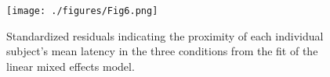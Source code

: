 \documentclass[10pt,letterpaper]{article}
\begin{document}


\begin{figure}[htb!]
\centering
\texttt{[image: ./figures/Fig6.png]}
\caption[Linear mixed effects model residuals] {Standardized residuals
  indicating the proximity of each individual subject's mean latency
  in the three conditions from the fit of the linear mixed effects
  model.}
\label{residuals}
\end{figure}
\end{document}
